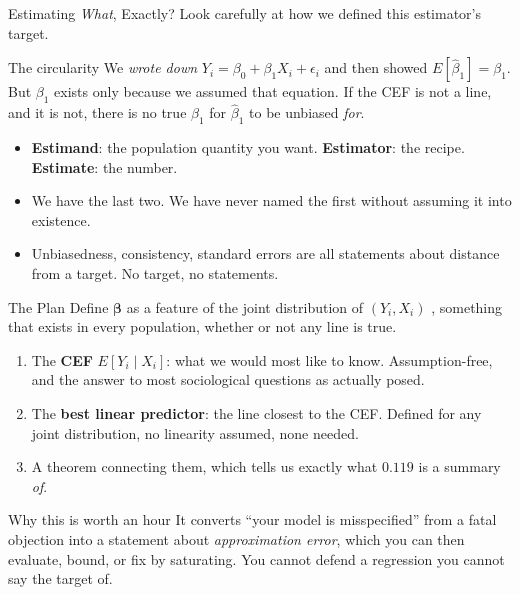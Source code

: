 \documentclass[aspectratio=169,11pt,xcolor=dvipsnames]{beamer}
\newcommand{\E}{E}
\begin{document}
\begin{frame}{Estimating \emph{What}, Exactly?}
Look carefully at how we defined this estimator's target.
\vskip3pt
\begin{block}{The circularity}
We \emph{wrote down} $Y_i = \beta_0 + \beta_1 X_i + \epsilon_i$ and then showed
$\E[\hat\beta_1] = \beta_1$. But $\beta_1$ exists only because we assumed that
equation. If the CEF is not a line, and it is not, there is no true
$\beta_1$ for $\hat\beta_1$ to be unbiased \emph{for}.
\end{block}
\vskip3pt
\begin{itemize}\itemsep3pt
  \item \textbf{Estimand}: the population quantity you want. \quad
        \textbf{Estimator}: the recipe. \quad
        \textbf{Estimate}: the number.
  \item We have the last two. We have never named the first without assuming it
        into existence.
  \item Unbiasedness, consistency, standard errors are \alert{all statements
        about distance from a target.} No target, no statements.
\end{itemize}
\end{frame}

\begin{frame}{The Plan}
Define $\bm\beta$ as a feature of the \alert{joint distribution of $(Y_i, X_i)$}
, something that exists in every population, whether or not any line is true.
\vskip6pt
\begin{enumerate}\itemsep5pt
  \item The \textbf{CEF} $\E[Y_i\mid X_i]$: what we would most like to know.
        Assumption-free, and the answer to most sociological questions as
        actually posed.
  \item The \textbf{best linear predictor}: the line closest to the CEF. Defined
        for any joint distribution, no linearity assumed, none needed.
  \item A theorem connecting them, which tells us exactly what $0.119$ is a
        summary \emph{of}.
\end{enumerate}
\vskip6pt
\begin{alertblock}{Why this is worth an hour}
It converts ``your model is misspecified'' from a fatal objection into a
statement about \emph{approximation error}, which you can then evaluate,
bound, or fix by saturating. You cannot defend a regression you cannot say the
target of.
\end{alertblock}
\end{frame}
\end{document}
